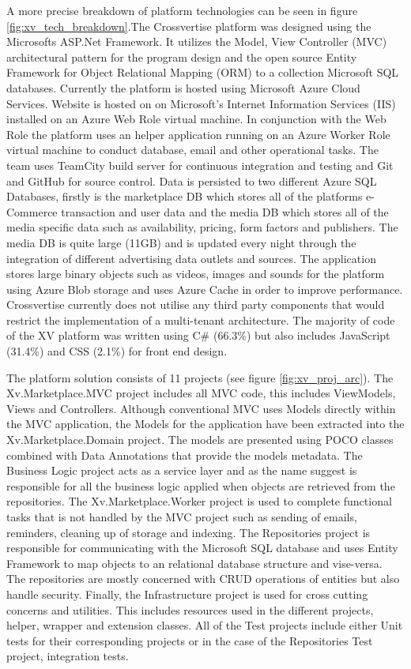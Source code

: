 A more precise breakdown of platform technologies can be seen in figure \ref{fig:xv_tech_breakdown}.The Crossvertise platform was designed using the Microsofts ASP.Net Framework. It utilizes the Model, View Controller (MVC) architectural pattern for the program design and the open source Entity Framework for Object Relational Mapping (ORM) to a collection Microsoft SQL databases. Currently the platform is hosted using Microsoft Azure Cloud Services. Website is hosted on  on Microsoft's Internet Information Services (IIS) installed on an Azure Web Role virtual machine. In conjunction with the Web Role the platform uses an helper application running on an Azure Worker Role virtual machine to conduct database, email and other operational tasks. The team uses TeamCity build server for continuous integration and testing and Git and GitHub for source control. Data is persisted to two different Azure SQL Databases, firstly is the marketplace DB which stores all of the platforms e-Commerce transaction and user data and the media DB which stores all of the media specific data such as availability, pricing, form factors and publishers. The media DB is quite large (11GB) and is updated every night through the integration of different advertising data outlets and sources. The application stores large binary objects such as videos, images and sounds for the platform using Azure Blob storage and uses Azure Cache in order to improve performance. Crossvertise currently does not utilise any third party components that would restrict the implementation of a multi-tenant architecture.
 The majority of code of the XV platform was written using C\# (66.3\%)  but also includes JavaScript (31.4\%) and CSS (2.1\%) for front end design. 

The platform solution consists of 11 projects (see figure \ref{fig:xv_proj_arc}). The Xv.Marketplace.MVC project includes all MVC code, this includes ViewModels, Views and Controllers. Although conventional MVC uses Models directly within the MVC application, the Models for the application have been extracted into the Xv.Marketplace.Domain project. The models are presented using POCO classes combined with Data Annotations that provide the models metadata. The Business Logic project acts as a service layer and as the name suggest is responsible for all the business logic applied when objects are retrieved from the repositories. The Xv.Marketplace.Worker project is used to complete functional tasks that is not handled by the MVC project such as sending of emails, reminders, cleaning up of storage and indexing. The Repositories project is responsible for communicating with the Microsoft SQL database and uses Entity Framework to map objects to an relational database structure and vise-versa. The repositories are mostly concerned with CRUD operations of entities but also handle security. Finally, the Infrastructure project is used for cross cutting concerns and utilities. This includes resources used in the different projects, helper, wrapper and extension classes. All of the Test projects include either Unit tests for their corresponding projects or in the case of the Repositories Test project, integration tests. 

